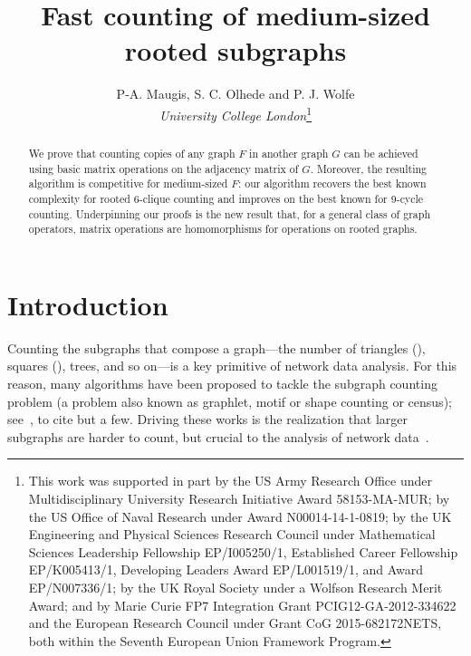 \documentclass{article}
\title{Fast counting of medium-sized rooted subgraphs}
\author{P-A. Maugis, S. C. Olhede and P. J. Wolfe\\
{\em University College London}\footnote{This work was supported in part by the US Army Research Office under Multidisciplinary University Research Initiative Award 58153-MA-MUR; by the US Office of Naval Research under Award N00014-14-1-0819; by the UK Engineering and Physical Sciences Research Council under Mathematical Sciences Leadership Fellowship EP/I005250/1, Established Career Fellowship EP/K005413/1, Developing Leaders Award EP/L001519/1, and Award EP/N007336/1; by the UK Royal Society under a Wolfson Research Merit Award; and by Marie Curie FP7 Integration Grant PCIG12-GA-2012-334622 and the European Research Council under Grant CoG 2015-682172NETS, both within the Seventh European Union Framework Program.}}\date{}
\theoremstyle{plain}
\begin{document}
\maketitle
\begin{abstract}
We prove that counting copies of any graph $F$ in another graph $G$ can be achieved using basic matrix operations on the adjacency matrix of $G$. Moreover, the resulting algorithm is competitive for medium-sized $F$: our algorithm recovers the best known complexity for rooted 6-clique counting and improves on the best known for 9-cycle counting. Underpinning our proofs is the new result that, for a general class of graph operators, matrix operations are homomorphisms for operations on rooted graphs.
\end{abstract}

\section{Introduction}
Counting the subgraphs that compose a graph---the number of triangles (\TexttriangleS\nobreak\hspace{.05em plus .01em}), squares (\Textsquare), trees, and so on---is a key primitive of network data analysis. For this reason, many algorithms have been proposed to tackle the subgraph counting problem (a problem also known as graphlet, motif or shape counting or census); see~\cite{chiba1985arboricity,eisenbrand2004complexity,latapy2008main,vassilevska2009clique,gonen2009,marcus2010efficient,kowaluk2013counting,kolda2014counting,bjorklund2014counting,hocevar2014,floderus2015detecting,williams2015finding,jha2015path,talukder2016distributed,ortmann2016quad}, to cite but a few. Driving these works is the realization that larger subgraphs are harder to count, but crucial to the analysis of network data~\cite{solava2012graphlet,Ali2014alignment}.
\end{document}
